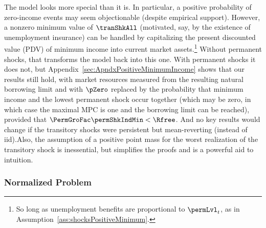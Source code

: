 \documentclass[\econtexRoot/BufferStockTheory]{subfiles}
\begin{document}
The model looks more special than it is.
In particular, a positive probability of zero-income events may seem objectionable (despite empirical support).
However, a nonzero minimum value of $\tranShkAll$ (motivated, say, by the existence of unemployment insurance) can be handled by capitalizing the present discounted value (PDV) of minimum income into current market assets.\footnote{So long as unemployment benefits are proportional to $\permLvl_{t}$, as in Assumption~\ref{ass:shocksPositiveMinimum}.}
Without permanent shocks, that transforms the model back into this one.
With permanent shocks it does not, but Appendix~\ref{sec:ApndxPositiveMinimumIncome} shows that our results still hold, with market resources measured from the resulting natural borrowing limit and with $\pZero$ replaced by the probability that minimum income and the lowest permanent shock occur together (which may be zero, in which case the maximal MPC is one and the borrowing limit can be reached), provided that $\PermGroFac\permShkIndMin<\Rfree$.
And no key results would change if the transitory shocks were persistent but mean-reverting (instead of iid).\@ Also, the assumption of a positive point mass for the worst realization of the transitory shock is inessential, but simplifies the proofs and is a powerful aid to intuition.

\hypertarget{The-Problem-Can-Be-Rewritten-in-Ratio-Form}{}
\hypertarget{The-Problem-Can-Be-Normalized-By-Permanent-Income}{}
\subsubsection{Normalized Problem}\label{subsubsec:ratio}
\end{document}
